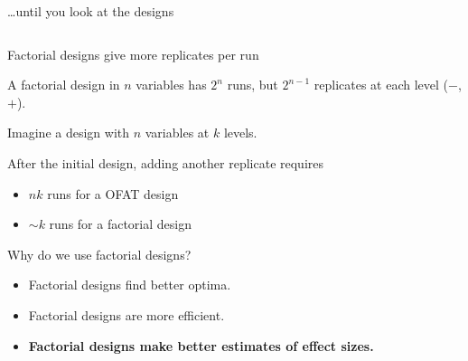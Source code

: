 \documentclass[10pt]{beamer}
\begin{document}
\begin{frame}{\ldots{}until you look at the designs}
\begin{columns}
\end{columns}

\end{frame}

\begin{frame}{Factorial designs give more replicates per run}
\protect\hypertarget{factorial-designs-give-more-replicates-per-run}{}

A factorial design in \(n\) variables has \(2^n\) runs, but \(2^{n-1}\)
replicates at each level (\ensuremath{\boldsymbol{-}},
\ensuremath{\boldsymbol{+}}).

\pause
\bigskip

Imagine a design with \(n\) variables at \(k\) levels.

After the initial design, adding another replicate requires

\begin{itemize}
\item
  \(nk\) runs for a OFAT design
\item
  \(\sim k\) runs for a factorial design
\end{itemize}

\end{frame}

\begin{frame}{Why do we use factorial designs?}

\begin{itemize}
\item
  Factorial designs find better optima.
\item
  Factorial designs are more efficient.
\item
  \textbf{Factorial designs make better estimates of effect sizes.}
\end{itemize}

\end{frame}
\end{document}

